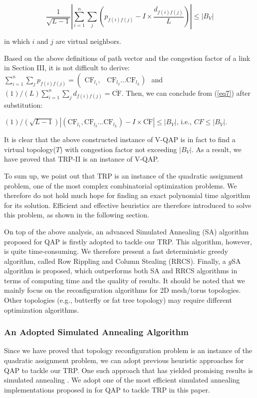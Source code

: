 \begin{equation}
    \frac{1}{\sqrt{L-1}}\left|\sum_{i=1}^{n} \sum_{j}\left(p_{f(i) f(j)}-I \times \frac{d_{f(i) f(j)}}{L}\right)\right| \leq\left|B_{V}\right|
    \label{eq7}
\end{equation}

in which $i$ and $j$ are virtual neighbors.

Based on the above definitions of path vector and the congestion factor of a link in Section III, it is not difficult to derive:
$\sum_{i=1}^{n} \sum_{j} p_{f(i) f(j)}=\left(\begin{array}{ll}\mathrm{CF}_{l_{1}}, & \left.\mathrm{CF}_{l_{2}} \ldots \mathrm{CF}_{l_{L}}\right)\end{array}\right.$ and $(1) /(L) \sum_{i=1}^{n} \sum_{j} d_{f(i) f(j)}=\overline{\mathrm{CF}}$. Then, we can conclude from (\ref{eq7}) after substitution:

$(1) /(\sqrt{L-1})\left|\left(\mathrm{CF}_{l_{1}}, \mathrm{CF}_{l_{2}} \ldots \mathrm{CF}_{l_{L}}\right)-I \times \overline{\mathrm{CF}}\right| \leq\left|B_{V}\right|$, i.e., $C F \leq\left|B_{V}\right|$.

It is clear that the above constructed instance of V-QAP is in fact to find a virtual topology($T$) with congestion factor not exceeding $\left|B_{V}\right|$. As a result, we have proved that TRP-II is an instance of V-QAP.

To sum up, we point out that TRP is an instance of the quadratic assignment problem, one of the most complex combinatorial optimization problems. We therefore do not hold much hope for finding an exact polynomial time algorithm for its solution. Efficient and effective heuristics are therefore introduced to solve this problem, as shown in the following section.

On top of the above analysis, an advanced Simulated Annealing (SA) algorithm proposed for QAP is firstly adopted to tackle our TRP. This algorithm, however, is quite time-consuming. We therefore present a fast deterministic greedy algorithm, called Row Rippling and Column Stealing (RRCS). Finally, a $g$SA algorithm is proposed, which outperforms both SA and RRCS algorithms in terms of computing time and the quality of results. It should be noted that we mainly focus on the reconfiguration algorithms for 2D mesh/torus topologies. Other topologies (e.g., butterfly or fat tree topology) may require different optimization algorithms.

\subsubsection{An Adopted Simulated Annealing Algorithm}
Since we have proved that topology reconfiguration problem is an instance of the quadratic assignment problem, we can adopt previous heuristic approaches for QAP to tackle our TRP. One such approach that has yielded promising results is simulated annealing \cite{misevivcius2003modified,burkard1984thermodynamically,connolly1990improved,bolte1996optimizing}. We adopt one of the most efficient simulated annealing implementations proposed in \cite{misevivcius2003modified} for QAP to tackle TRP in this paper.

